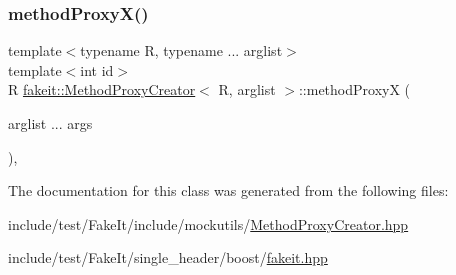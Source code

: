 \subsubsection{\texorpdfstring{methodProxyX()}{methodProxyX()}\hspace{0.1cm}{\footnotesize\ttfamily [9/9]}}
{\footnotesize\ttfamily template$<$typename R, typename ... arglist$>$ \\
template$<$int id$>$ \\
R \mbox{\hyperlink{classfakeit_1_1MethodProxyCreator}{fakeit\+::\+Method\+Proxy\+Creator}}$<$ R, arglist $>$\+::method\+ProxyX (\begin{DoxyParamCaption}\item[{arglist ...}]{args }\end{DoxyParamCaption})\hspace{0.3cm}{\ttfamily [inline]}, {\ttfamily [protected]}}



The documentation for this class was generated from the following files\+:\begin{DoxyCompactItemize}
\item 
include/test/\+Fake\+It/include/mockutils/\mbox{\hyperlink{MethodProxyCreator_8hpp}{Method\+Proxy\+Creator.\+hpp}}\item 
include/test/\+Fake\+It/single\+\_\+header/boost/\mbox{\hyperlink{single__header_2boost_2fakeit_8hpp}{fakeit.\+hpp}}\end{DoxyCompactItemize}
